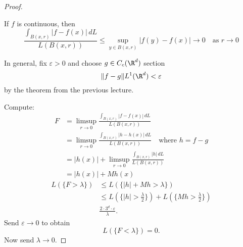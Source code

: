 \begin{proof} \phantom{=} \hfill
  \begin{steps}
    \item If $f$ is continuous, then
      \[
        \frac{\int_{B(x,r)}|f - f(x)| \, dL}{L(B(x,r))} \leq \sup_{y \in B(x,r)} |f(y) - f(x)| \to 0 \quad \textrm{as } r \to 0
      \]
    \item In general, fix $\varepsilon > 0$ and choose $g \in C_c (\R^d)$ section
      \[
        \| f - g \| L^1(\R^d) < \varepsilon
      \]
      by the theorem from the previous lecture.
  \end{steps}
  Compute:
  \begin{align*}
    F & = \limsup_{r \to 0} \frac{\int_{B(x,r)}|f - f(x)| \, dL}{L(B(x,r))} \\
      & = \limsup_{r \to 0} \frac{\int_{B(x,r)}|h - h(x)| \, dL}{L(B(x,r))} \quad \textrm{where } h = f - g \\
      & = |h(x)| + \limsup_{r \to 0} \frac{\int_{B(x,r)}|h| \, dL}{L(B(x,r))} \\
      & = |h(x)| + Mh(x)
  \end{align*}
  \begin{align*}
    L(\{F > \lambda \}) & \leq L(\{ |h| + Mh > \lambda \}) \\
                        & \leq L(\{ |h| > \frac{\lambda}{2} \}) + L(\{ Mh > \frac{\lambda}{2} \}) \\
                        & \frac{2 \cdot 3^d \cdot \varepsilon}{\lambda}.
  \end{align*}
  Send $\varepsilon \to 0$ to obtain
  \[
    L(\{F < \lambda\}) = 0.
  \]
  Now send $\lambda \to 0$.
\end{proof}




